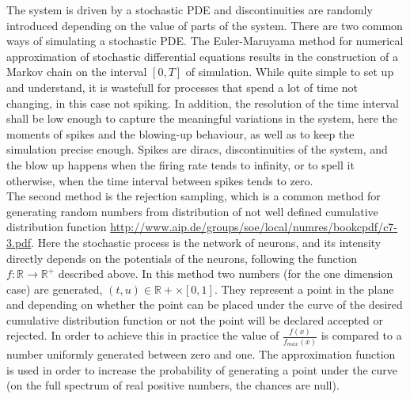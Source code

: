 	The system is driven by a stochastic PDE and discontinuities are randomly introduced depending on the value of parts of the system. There are two common ways of simulating a stochastic PDE. The Euler-Maruyama method for numerical approximation of stochastic differential equations results in the construction of a Markov chain on the interval $[0,T]$ of simulation. While quite simple to set up and understand, it is wastefull for processes that spend a lot of time not changing, in this case not spiking. In addition, the resolution of the time interval shall be low enough to capture the meaningful variations in the system, here the moments of spikes and the blowing-up behaviour, as well as to keep the simulation precise enough. Spikes are diracs, discontinuities of the system, and the blow up happens when the firing rate tends to infinity, or to spell it otherwise, when the time interval between spikes tends to zero.\\
	The second method is the rejection sampling, which is a common method for generating random numbers from distribution of not well defined cumulative distribution function \url{http://www.aip.de/groups/soe/local/numres/bookcpdf/c7-3.pdf}. Here the stochastic process is the network of neurons, and its intensity directly depends on the potentials of the neurons, following the function $f:\mathbb{R}\rightarrow\mathbb{R}^+$ described above. In this method two numbers (for the one dimension case) are generated, $(t,u)\in\mathbb{R}+\times[0,1]$. They represent a point in the plane and depending on whether the point can be placed under the curve of the desired cumulative distribution function or not the point will be declared accepted or rejected. In order to achieve this in practice the value of $\frac{f(x)}{f_{max}(x)}$ is compared to a number uniformly generated between zero and one. The approximation function is used in order to increase the probability of generating a point under the curve (on the full spectrum of real positive numbers, the chances are null).\\

	

